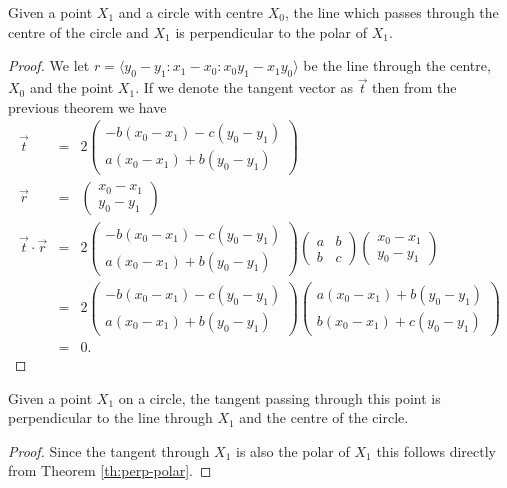 \begin{theorem}\label{th:perp-polar}Given a point $X_1$ and a circle with centre $X_0$, the line which passes through the centre of the circle and $X_1$ is perpendicular to the polar of $X_1$.
\end{theorem}
\begin{proof}We let $r = \langle y_0 - y_1\!:\!x_1 - x_0 \!:\! x_0y_1 - x_1y_0 \rangle$ be the line through the centre, $X_0$ and the point $X_1$. If we denote the tangent vector as $\vec{t}$ then from the previous theorem we have
\begin{eqnarray*}
\vec{t}         & = & 2\begin{pmatrix}-b(x_0 - x_1) - c(y_0 - y_1) \\ a(x_0 - x_1) + b(y_0 - y_1)\end{pmatrix}\\
\vec{r} & = & \begin{pmatrix}x_0 - x_1 \\ y_0 - y_1\end{pmatrix}\\
\vec{t}\cdot\vec{r} & = & 2\begin{pmatrix}-b(x_0 - x_1) - c(y_0 - y_1) \\ a(x_0 - x_1) + b(y_0 - y_1)\end{pmatrix}  \begin{pmatrix}a & b \\ b & c\end{pmatrix} \begin{pmatrix}x_0 - x_1 \\ y_0 - y_1\end{pmatrix}\\
                & = & 2\begin{pmatrix}-b(x_0 - x_1) - c(y_0 - y_1) \\ a(x_0 - x_1) + b(y_0 - y_1)\end{pmatrix}  \begin{pmatrix}a(x_0 - x_1) + b(y_0 - y_1) \\ b(x_0 - x_1) + c(y_0 - y_1)\end{pmatrix}\\
                & = & 0.
\end{eqnarray*}
\end{proof}

\begin{corollary} Given a point $X_1$ on a circle, the tangent passing through this point is perpendicular to the line through $X_1$ and the centre of the circle.
\end{corollary}
\begin{proof}
Since the tangent through $X_1$ is also the polar of $X_1$ this follows directly from Theorem \ref{th:perp-polar}.
\end{proof}

